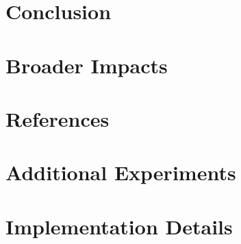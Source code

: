 \documentclass{article}
\begin{document}
\section{Conclusion}


\section{Broader Impacts}


\section*{References}


\appendix
\section{Additional Experiments}


\section{Implementation Details}
\end{document}
